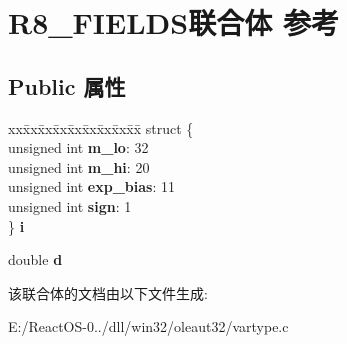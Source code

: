 \hypertarget{union_r8___f_i_e_l_d_s}{}\section{R8\+\_\+\+F\+I\+E\+L\+D\+S联合体 参考}
\label{union_r8___f_i_e_l_d_s}
\subsection*{Public 属性}
\begin{DoxyCompactItemize}
\item 
\mbox{\label{union_r8___f_i_e_l_d_s_a08a4458ab372f0c6cf50e8a1ebc1a352}} 
\begin{tabbing}
xx\=xx\=xx\=xx\=xx\=xx\=xx\=xx\=xx\=\kill
struct \{\\
\>unsigned int {\bfseries m\_lo}: 32\\
\>unsigned int {\bfseries m\_hi}: 20\\
\>unsigned int {\bfseries exp\_bias}: 11\\
\>unsigned int {\bfseries sign}: 1\\
\} {\bfseries i}\\

\end{tabbing}\item 
\mbox{\label{union_r8___f_i_e_l_d_s_a03d2146e4a0eb04f8d3aa40f59af70bd}} 
double {\bfseries d}
\end{DoxyCompactItemize}


该联合体的文档由以下文件生成\+:\begin{DoxyCompactItemize}
\item 
E\+:/\+React\+O\+S-\/0../dll/win32/oleaut32/vartype.\+c\end{DoxyCompactItemize}
